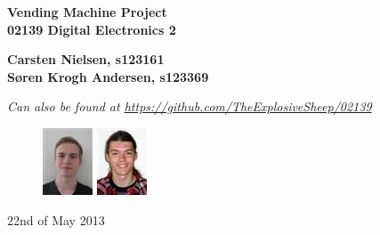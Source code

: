 \thispagestyle{empty} %
\begin{center}
\textbf{\Huge {Vending Machine Project}\\ \vspace{1cm}
\huge{02139 Digital Electronics 2}}
\end{center}
\vspace{1cm}
\begin{center}
\Large{\textbf{Carsten Nielsen, s123161 \\ Søren Krogh Andersen, s123369}} \\
\vspace{1cm}

\emph{Can also be found at \url{https://github.com/TheExplosiveSheep/02139}}
\end{center}
\vspace{6cm}
\begin{figure}[h]
\hfill
\includegraphics{pictures/s123161.png}%
\includegraphics{pictures/s123369.png}%
\end{figure}
22nd of May 2013

\thispagestyle{empty}
\newpage
